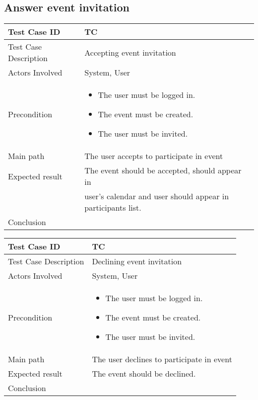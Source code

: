 \newpage
\subsection{Answer event invitation}

\begin{center} \begin{tabular}{|l|l|}
  \hline
  Test Case ID & TC \z\\
  \hline
  Test Case Description & Accepting event invitation\\
  \hline
  Actors Involved & System, User\\
   \hline
  Precondition & \begin{minipage}{5in}
    \vskip 4pt
            \begin{itemize}
              \item The user must be logged in.
              \item The event must be created.
              \item The user must be invited.
            \end{itemize}
    \vskip 4pt
  \end{minipage}\\
  \hline
  Main path &   The user accepts to participate in event \\
  \hline
  Expected result & The event should be accepted, should appear in\\
  & user's calendar and user should appear in participants list.\\
  \hline
  Conclusion & \\
  \hline
\end{tabular} \end{center}

\begin{center} \begin{tabular}{|l|l|}
  \hline
  Test Case ID & TC \z\\
  \hline
  Test Case Description & Declining event invitation\\
  \hline
   Actors Involved & System, User\\
   \hline
  Precondition & \begin{minipage}{5in}
    \vskip 4pt
            \begin{itemize}
              \item The user must be logged in.
              \item The event must be created.
              \item The user must be invited.
            \end{itemize}
    \vskip 4pt
  \end{minipage}\\
  \hline
  Main path & The user declines to participate in event \\
  \hline
  Expected result & The event should be declined.\\
  \hline
  Conclusion & \\
  \hline
\end{tabular} \end{center}

